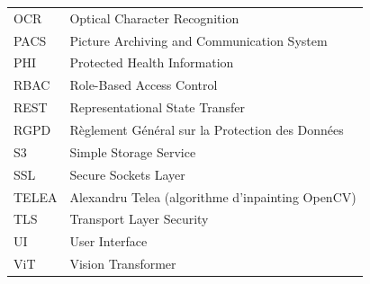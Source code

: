 \begin{longtable}{p{3.2cm} p{11cm}}
OCR    & Optical Character Recognition \\
PACS   & Picture Archiving and Communication System \\
PHI    & Protected Health Information \\
RBAC   & Role-Based Access Control \\
REST   & Representational State Transfer \\
RGPD   & Règlement Général sur la Protection des Données \\
S3     & Simple Storage Service \\
SSL    & Secure Sockets Layer \\
TELEA  & Alexandru Telea (algorithme d'inpainting OpenCV) \\
TLS    & Transport Layer Security \\
UI     & User Interface \\
ViT    & Vision Transformer \\
\end{longtable}

\newpage
